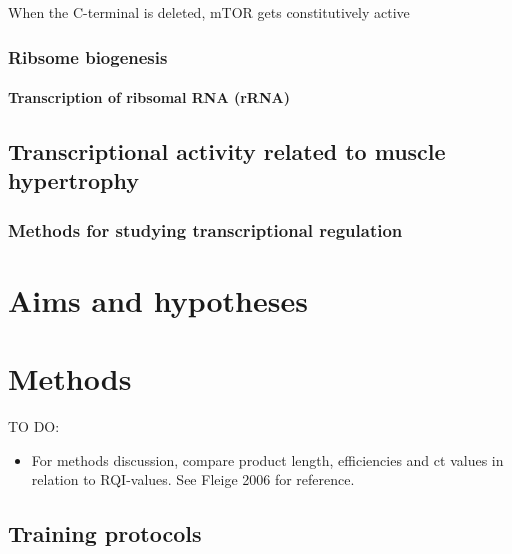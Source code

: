 \documentclass[twoside,10pt]{gihclass} %
\providecommand{\tightlist}{%
  \setlength{\itemsep}{0pt}\setlength{\parskip}{0pt}}
\begin{document}
When the C-terminal is deleted, mTOR gets constitutively active

\hypertarget{ribsome-biogenesis}{%
\subsection{Ribsome biogenesis}\label{ribsome-biogenesis}}

\hypertarget{transcription-of-ribsomal-rna-rrna}{%
\subsubsection{Transcription of ribsomal RNA (rRNA)}\label{transcription-of-ribsomal-rna-rrna}}

\hypertarget{transcriptional-activity-related-to-muscle-hypertrophy}{%
\section{Transcriptional activity related to muscle hypertrophy}\label{transcriptional-activity-related-to-muscle-hypertrophy}}

\hypertarget{methods-for-studying-transcriptional-regulation}{%
\subsection{Methods for studying transcriptional regulation}\label{methods-for-studying-transcriptional-regulation}}

\hypertarget{aims-and-hypotheses}{%
\chapter{Aims and hypotheses}\label{aims-and-hypotheses}}

\hypertarget{methods}{%
\chapter{Methods}\label{methods}}

TO DO:
\begin{itemize}
\tightlist
\item
  For methods discussion, compare product length, efficiencies and ct values in relation to RQI-values. See Fleige 2006 for reference.
\end{itemize}
\hypertarget{training-protocols}{%
\section{Training protocols}\label{training-protocols}}
\end{document}
